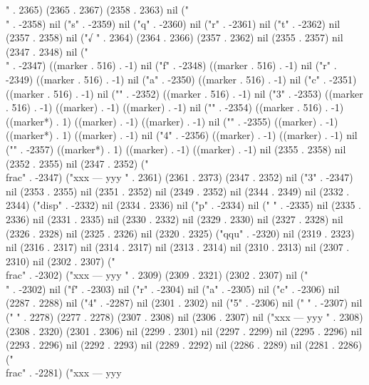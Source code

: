 " . 2365) (2365 . 2367) (2358 . 2363) nil ("\\" . -2358) nil ("s" . -2359) nil ("q" . -2360) nil ("r" . -2361) nil ("t" . -2362) nil (2357 . 2358) nil ("√
" . 2364) (2364 . 2366) (2357 . 2362) nil (2355 . 2357) nil (2347 . 2348) nil ("\\" . -2347) ((marker . 516) . -1) nil ("f" . -2348) ((marker . 516) . -1) nil ("r" . -2349) ((marker . 516) . -1) nil ("a" . -2350) ((marker . 516) . -1) nil ("c" . -2351) ((marker . 516) . -1) nil ("{" . -2352) ((marker . 516) . -1) nil ("3" . -2353) ((marker . 516) . -1) ((marker) . -1) ((marker) . -1) nil ("}" . -2354) ((marker . 516) . -1) ((marker*) . 1) ((marker) . -1) ((marker) . -1) nil ("{" . -2355) ((marker) . -1) ((marker*) . 1) ((marker) . -1) nil ("4" . -2356) ((marker) . -1) ((marker) . -1) nil ("}" . -2357) ((marker*) . 1) ((marker) . -1) ((marker) . -1) nil (2355 . 2358) nil (2352 . 2355) nil (2347 . 2352) ("\\frac" . -2347) ("xxx
---
yyy
" . 2361) (2361 . 2373) (2347 . 2352) nil ("3" . -2347) nil (2353 . 2355) nil (2351 . 2352) nil (2349 . 2352) nil (2344 . 2349) nil (2332 . 2344) ("disp" . -2332) nil (2334 . 2336) nil ("p" . -2334) nil (" " . -2335) nil (2335 . 2336) nil (2331 . 2335) nil (2330 . 2332) nil (2329 . 2330) nil (2327 . 2328) nil (2326 . 2328) nil (2325 . 2326) nil (2320 . 2325) ("qqu" . -2320) nil (2319 . 2323) nil (2316 . 2317) nil (2314 . 2317) nil (2313 . 2314) nil (2310 . 2313) nil (2307 . 2310) nil (2302 . 2307) ("\\frac" . -2302) ("xxx
---
yyy
" . 2309) (2309 . 2321) (2302 . 2307) nil ("\\" . -2302) nil ("f" . -2303) nil ("r" . -2304) nil ("a" . -2305) nil ("c" . -2306) nil (2287 . 2288) nil ("4" . -2287) nil (2301 . 2302) nil ("5" . -2306) nil ("
" . -2307) nil (" " . 2278) (2277 . 2278) (2307 . 2308) nil (2306 . 2307) nil ("xxx
---
yyy
" . 2308) (2308 . 2320) (2301 . 2306) nil (2299 . 2301) nil (2297 . 2299) nil (2295 . 2296) nil (2293 . 2296) nil (2292 . 2293) nil (2289 . 2292) nil (2286 . 2289) nil (2281 . 2286) ("\\frac" . -2281) ("xxx
---
yyy
